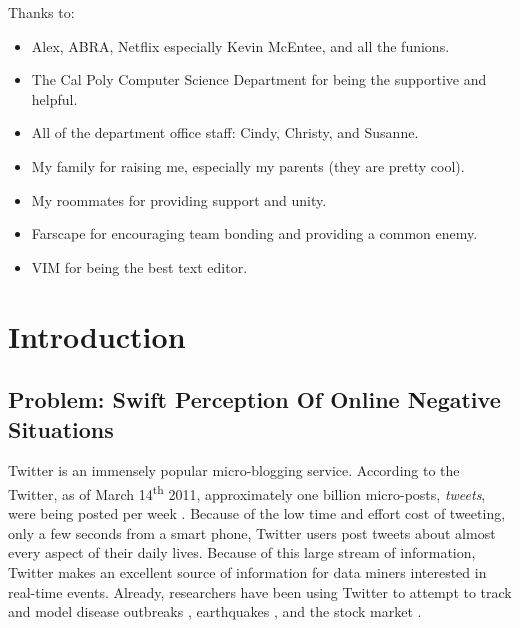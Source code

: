 \documentclass[12pt]{ucthesis}
\begin{document}
\begin{frontmatter}
\begin{acknowledgements}
\noindent
Thanks to:
\begin{itemize}
   \item Alex, ABRA, Netflix especially Kevin McEntee, and all the funions.
   \item The Cal Poly Computer Science Department for being the supportive and helpful.
   \item All of the department office staff: Cindy, Christy, and Susanne.
   \item My family for raising me, especially my parents (they are pretty cool).
   \item My roommates for providing support and unity.
   \item Farscape for encouraging team bonding and providing a common enemy.
   \item VIM for being the best text editor.
\end{itemize}

\end{acknowledgements}

\tableofcontents

\listoftables

\listoffigures

\end{frontmatter}

\pagestyle{plain}

\renewcommand{\baselinestretch}{1.66}

\part{Introduction}
\label{introduction}

\chapter{Problem: Swift Perception Of Online Negative Situations}
\label{general-problem}

Twitter is an immensely popular micro-blogging service. According to the Twitter, as of March 14\textsuperscript{th} 2011,
approximately one billion micro-posts, \emph{tweets}, were being posted per week \cite{TwitterBlog}.
Because of the low time and effort cost of tweeting, only a few seconds from a smart phone,
Twitter users post tweets about almost every aspect of their daily lives.
Because of this large stream of information, Twitter makes an excellent source of information for
data miners interested in real-time events. Already, researchers have been using Twitter to attempt to track and model
disease outbreaks \cite{DetectingInfluenza}, earthquakes \cite{Earthquakes}, and the
stock market \cite{StockMarket}.
\end{document}
